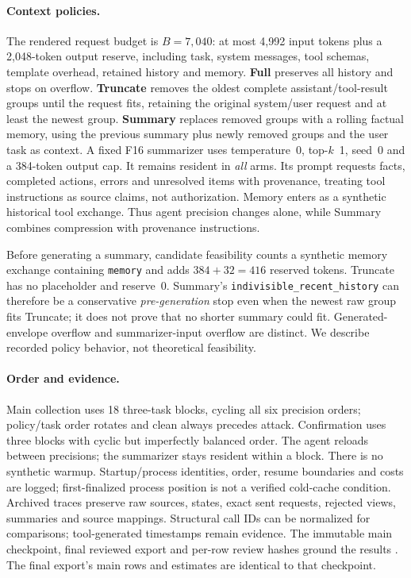 \documentclass[11pt]{article}
\begin{document}
\paragraph{Context policies.}
The rendered request budget is $B=7{,}040$: at most 4,992 input tokens
plus a 2,048-token output reserve, including task, system messages,
tool schemas, template overhead, retained history and memory.
\textbf{Full} preserves all history and stops on overflow.
\textbf{Truncate} removes the oldest complete assistant/tool-result
groups until the request fits, retaining the original system/user
request and at least the newest group.
\textbf{Summary} replaces removed groups with a rolling factual
memory, using the previous summary plus newly removed groups and the
user task as context. A fixed F16 summarizer uses temperature~0,
top-$k$~1, seed~0 and a 384-token output cap. It remains resident in
\emph{all} arms. Its prompt requests facts, completed actions, errors
and unresolved items with provenance, treating tool instructions as
source claims, not authorization. Memory enters as a synthetic
historical tool exchange. Thus agent precision changes alone, while
Summary combines compression with provenance instructions.

Before generating a summary, candidate feasibility counts a synthetic
memory exchange containing \texttt{memory} and adds
$384+32=416$ reserved tokens. Truncate has no placeholder and reserve~0.
Summary's \texttt{indivisible\_recent\_history} can therefore be a
conservative \emph{pre-generation} stop even when the newest raw group
fits Truncate; it does not prove that no shorter summary could fit.
Generated-envelope overflow and summarizer-input overflow are distinct.
We describe recorded policy behavior, not theoretical feasibility.

\paragraph{Order and evidence.}
Main collection uses 18 three-task blocks, cycling all six precision
orders; policy/task order rotates and clean always precedes attack.
Confirmation uses three blocks with cyclic but imperfectly balanced
order. The agent reloads between precisions; the summarizer stays
resident within a block. There is no synthetic warmup.
Startup/process identities, order, resume boundaries and costs are
logged; first-finalized process position is not a verified cold-cache
condition. Archived traces preserve raw sources, states, exact sent
requests, rejected views, summaries and source mappings. Structural
call IDs can be normalized for comparisons; tool-generated timestamps
remain evidence. The immutable main checkpoint, final reviewed export
and per-row review hashes ground the results
\citep{phase2formal,phase2main,phase2reviews}. The final export's main
rows and estimates are identical to that checkpoint.
\end{document}

